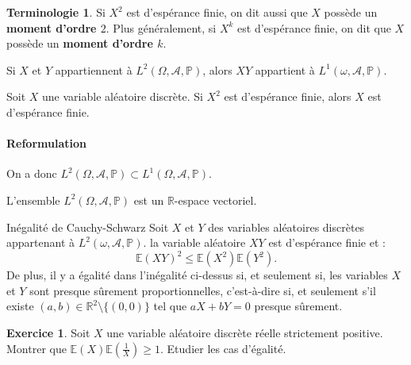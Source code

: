 \documentclass[french]{article}
\renewcommand{\P}{\mathbb{P}}
\newcommand{\R}{\mathbb{R}}
\newcommand{\E}{\mathbb{E}}
\theoremstyle{plain}
\theoremstyle{definition}
\newtheorem{exo}{Exercice}
\newtheorem*{terminologie}{Terminologie}
\theoremstyle{remark}
\begin{document}
\begin{terminologie}
	Si $X^2$ est d'espérance finie, on dit aussi que $X$ possède un \textbf{moment d'ordre $2$}. Plus généralement, si $X^k$ est d'espérance finie, on dit que $X$ possède un \textbf{moment d'ordre $k$}.
\end{terminologie}

\begin{thm}{}%
	Si $X$ et $Y$ appartiennent à $L^2(\Omega,\mathcal{A},\P)$, alors $XY$ appartient à $L^1(\omega,\mathcal{A},\P)$.
\end{thm}

\begin{thm}{}%
	Soit $X$ une variable aléatoire discrète. Si $X^2$ est d'espérance finie, alors $X$ est d'espérance finie.
\end{thm}

\paragraph{Reformulation} On a donc $L^2(\Omega,\mathcal{A},\P)\subset L^1(\Omega,\mathcal{A},\P)$.

\begin{thm}{}%
	L'ensemble $L^2(\Omega,\mathcal{A},\P)$ est un $\R$-espace vectoriel.
\end{thm}

\begin{thm}{Inégalité de Cauchy-Schwarz}%
	Soit $X$ et $Y$ des variables aléatoires discrètes appartenant à $L^2(\omega,\mathcal{A},\P)$. la variable aléatoire $XY$ est d'espérance finie et :
	$$\E(XY)^2\leqslant\E(X^2)\E(Y^2).$$
	De plus, il y a égalité dans l'inégalité ci-dessus si, et seulement si, les variables $X$ et $Y$ sont presque sûrement proportionnelles, c'est-à-dire si, et seulement s'il existe $(a,b)\in\R^2\setminus\{(0,0)\}$ tel que $aX+bY=0$ presque sûrement.
\end{thm}

\begin{exo}
	Soit $X$ une variable aléatoire discrète réelle strictement positive.\\
	Montrer que $\E(X)\displaystyle\E\left(\frac{1}{X}\right)\geqslant1$. Etudier les cas d'égalité.
\end{exo}
\end{document}
